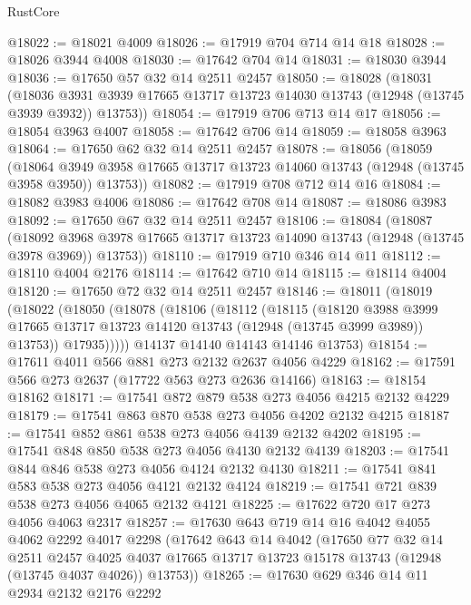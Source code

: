 \begin{lexlean}{RustCore}
\begin{coremodule}
@18022 := @18021 @4009
@18026 := @17919 @704 @714 @14 @18
@18028 := @18026 @3944 @4008
@18030 := @17642 @704 @14
@18031 := @18030 @3944
@18036 := @17650 @57 @32 @14 @2511 @2457
@18050 := @18028
    (@18031
      (@18036 @3931 @3939 @17665 @13717 @13723 @14030 @13743 (@12948 (@13745 @3939 @3932)) @13753))
@18054 := @17919 @706 @713 @14 @17
@18056 := @18054 @3963 @4007
@18058 := @17642 @706 @14
@18059 := @18058 @3963
@18064 := @17650 @62 @32 @14 @2511 @2457
@18078 := @18056
    (@18059
      (@18064 @3949 @3958 @17665 @13717 @13723 @14060 @13743 (@12948 (@13745 @3958 @3950)) @13753))
@18082 := @17919 @708 @712 @14 @16
@18084 := @18082 @3983 @4006
@18086 := @17642 @708 @14
@18087 := @18086 @3983
@18092 := @17650 @67 @32 @14 @2511 @2457
@18106 := @18084
    (@18087
      (@18092 @3968 @3978 @17665 @13717 @13723 @14090 @13743 (@12948 (@13745 @3978 @3969)) @13753))
@18110 := @17919 @710 @346 @14 @11
@18112 := @18110 @4004 @2176
@18114 := @17642 @710 @14
@18115 := @18114 @4004
@18120 := @17650 @72 @32 @14 @2511 @2457
@18146 := @18011
    (@18019
      (@18022
        (@18050
          (@18078
            (@18106
              (@18112
                (@18115
                  (@18120
                    @3988
                    @3999
                    @17665
                    @13717
                    @13723
                    @14120
                    @13743
                    (@12948 (@13745 @3999 @3989))
                    @13753))
                @17935)))))
      @14137
      @14140
      @14143
      @14146
      @13753)
@18154 := @17611 @4011 @566 @881 @273 @2132 @2637 @4056 @4229
@18162 := @17591 @566 @273 @2637 (@17722 @563 @273 @2636 @14166)
@18163 := @18154 @18162
@18171 := @17541 @872 @879 @538 @273 @4056 @4215 @2132 @4229
@18179 := @17541 @863 @870 @538 @273 @4056 @4202 @2132 @4215
@18187 := @17541 @852 @861 @538 @273 @4056 @4139 @2132 @4202
@18195 := @17541 @848 @850 @538 @273 @4056 @4130 @2132 @4139
@18203 := @17541 @844 @846 @538 @273 @4056 @4124 @2132 @4130
@18211 := @17541 @841 @583 @538 @273 @4056 @4121 @2132 @4124
@18219 := @17541 @721 @839 @538 @273 @4056 @4065 @2132 @4121
@18225 := @17622 @720 @17 @273 @4056 @4063 @2317
@18257 := @17630
    @643
    @719
    @14
    @16
    @4042
    @4055
    @4062
    @2292
    @4017
    @2298
    (@17642
      @643
      @14
      @4042
      (@17650
        @77
        @32
        @14
        @2511
        @2457
        @4025
        @4037
        @17665
        @13717
        @13723
        @15178
        @13743
        (@12948 (@13745 @4037 @4026))
        @13753))
@18265 := @17630 @629 @346 @14 @11 @2934 @2132 @2176 @2292

\end{coremodule}
\end{lexlean}
